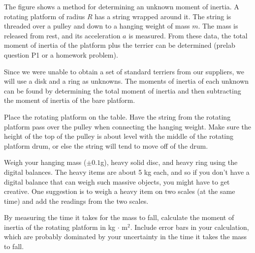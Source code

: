 \label{lab:moment-of-inertia-brian}

\apparatus
{}


\introduction

The figure shows a method for determining an unknown moment of inertia.
A rotating platform of radius $R$ has
a string wrapped around it. The string is threaded over a pulley and
down to a hanging weight of mass $m$. The mass is released from rest,
and its acceleration $a$ is measured. From these data, the total moment
of inertia of the platform plus the terrier can be determined (prelab question
P1 or a homework problem).


Since we were unable to obtain a set of standard terriers from our
suppliers, we will use a disk and a ring as unknowns. The moments of
inertia of each unknown can be found by determining the total moment
of inertia and then subtracting the moment of inertia of the bare platform.


\setup

Place the rotating platform on the table. Have the string from the
rotating platform pass over the pulley 
when connecting the hanging weight. Make sure the height of the top of
the pulley is about level with the middle of the rotating platform
drum, or else the string will tend to move off of the drum. 

Weigh your hanging mass ($\pm0.1$g), heavy solid disc, and heavy ring
using the digital balances. The heavy items are about 5 kg each, and
so if you don't have a digital balance that can weigh such massive
objects, you might have to get creative. One suggestion is to weigh a
heavy item on two scales (at the same time) and add the readings from
the two scales. 

\observations


By measuring the time it takes for the mass to fall, calculate the
moment of inertia of the rotating platform in kg$\,\cdot\,$m$^2$.
Include error bars in your calculation, which are probably dominated
by your uncertainty in the time it takes the mass to fall. 

